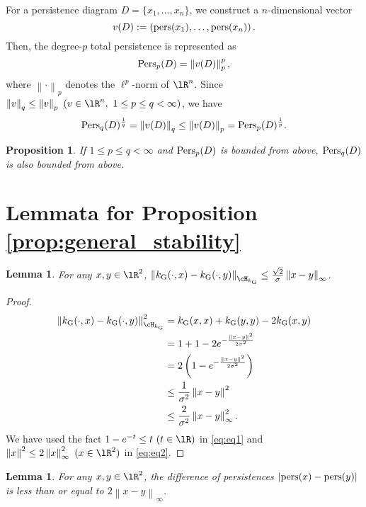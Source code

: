 \documentclass{article}
\newtheorem{lem}[thm]{Lemma}
\newtheorem{prop}[thm]{Proposition}
\newcommand{\Pers}{{\rm Pers}}
\newcommand{\pers}{{\rm pers}}
\providecommand{\abs}[1]{\left\lvert#1\right\rvert}
\providecommand{\norm}[1]{\left\lVert#1\right\rVert}
\providecommand{\pare}[1]{\left( #1 \right)}
\begin{document}
For a persistence diagram $D=\{x_{1},\ldots,x_{n} \}$, we construct a $n$-dimensional vector
\[
v(D):=\pare{ \pers(x_{1}),\ldots,\pers(x_{n}) }.
\]
Then, the degree-$p$ total persistence is represented as 
\[
\Pers_{p}(D)=\norm{v(D)}^{p}_{p},
\]
where $\norm{\cdot}_{p}$ denotes the $\ell^{p}$-norm of $\lR^{n}$.
Since $\norm{v}_{q} \leq \norm{v}_{p} \ (v \in \lR^{n}, \ 1 \leq p \leq q < \infty)$, we have
\[
\Pers_{q}(D)^{\frac{1}{q}} =\norm{v(D)}_{q} \leq \norm{v(D)}_{p} = \Pers_{p}(D)^{\frac{1}{p}}.
\]

\begin{prop}
\label{prop:persistence_inequality}
If $1 \leq p \leq q<\infty$ and $\Pers_{p}(D)$ is bounded from above, $\Pers_{q}(D)$ is also bounded from above.
\end{prop}



\section{Lemmata for Proposition \ref{prop:general_stability}}
\label{sec:stability}

\begin{lem}
\label{lemm:Lip_k}
For any $x,y \in \lR^{2}$, $\norm{k_{{\rm G}}(\cdot,x)-k_{{\rm G}}(\cdot,y)}_{\cH_{k_{{\rm G}}}} \leq \frac{\sqrt{2}}{\sigma} \norm{x-y}_{\infty}$.
\end{lem}

\begin{proof}
\begin{align}
\norm{k_{{\rm G}}(\cdot,x)-k_{{\rm G}}(\cdot,y)}^{2}_{\cH_{k_{{\rm G}}}} \nonumber 
&=k_{{\rm G}}(x,x)+k_{{\rm G}}(y,y)-2k_{{\rm G}}(x,y) \nonumber \\
&=1+1-2 e^{-\frac{\norm{x-y}^{2}}{2 \sigma^{2}}} \nonumber \\
&= 2 \pare{ 1-e^{-\frac{\norm{x-y}^{2}}{2 \sigma^{2}}} } \nonumber  \\
& \leq  \frac{1}{\sigma^{2}}\norm{x-y}^{2} \label{eq:eq1} \\
& \leq \frac{2}{\sigma^{2}}\norm{x-y}^{2}_{\infty}. \label{eq:eq2} 
\end{align}
We have used the fact $1-e^{-t} \leq t \ ( t \in \lR)$ in \eqref{eq:eq1} and $\norm{x}^{2} \leq 2 \norm{x}^{2}_{\infty} \ (x \in \lR^{2})$ in \eqref{eq:eq2}.
\end{proof}

\begin{lem}
\label{lemm:persistence}
For any $x,y \in \lR^{2}$, the difference of persistences $\abs{\pers(x)-\pers(y)}$ is less than or equal to $2 \norm{x-y}_{\infty}$.
\end{lem}
\end{document}
